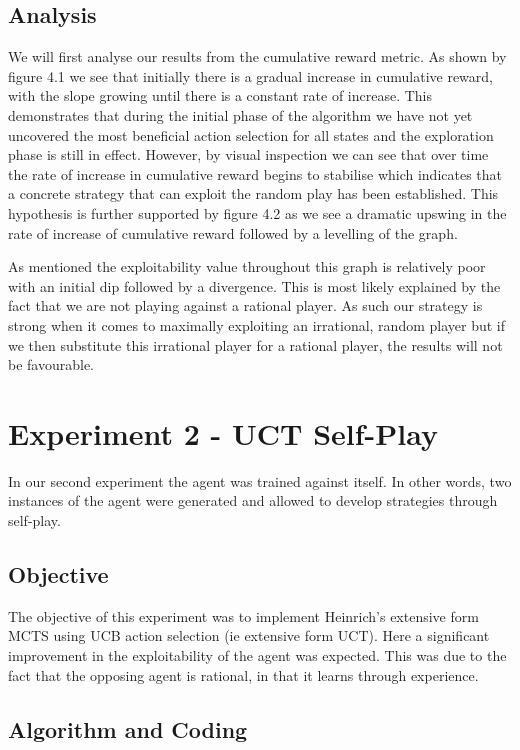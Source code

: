 \subsection{Analysis}\label{subsec:analysis1}
We will first analyse our results from the cumulative reward metric.
As shown by figure 4.1 we see that initially there is a gradual increase in cumulative reward,
with the slope growing until there is a constant rate of increase.
This demonstrates that during the initial phase of the algorithm we have not yet uncovered
the most beneficial action selection for all states and the exploration phase is still in effect.
However, by visual inspection we can see that over time the rate of increase in cumulative
reward begins to stabilise which indicates that a concrete strategy that can exploit
the random play has been established.
This hypothesis is further supported by figure 4.2 as we see a dramatic upswing
in the rate of increase of cumulative reward followed by a levelling of the graph.

As mentioned the exploitability value throughout this graph is relatively poor with an initial dip followed
by a divergence.
This is most likely explained by the fact that we are not playing against a rational player.
As such our strategy is strong when it comes to maximally exploiting an irrational, random player
but if we then substitute this irrational player for a rational player, the results will not be favourable.

\section{Experiment 2 - UCT Self-Play} \label{sec:experiment2}
In our second experiment the agent was trained against itself.
In other words, two instances of the agent were generated and allowed to develop strategies
through self-play.

\subsection{Objective}\label{subsec:objective2}
The objective of this experiment was to implement Heinrich's extensive form MCTS using UCB action
selection (ie extensive form UCT).
Here a significant improvement in the exploitability of the agent was expected.
This was due to the fact that the opposing agent is rational, in that it learns
through experience.


\subsection{Algorithm and Coding}\label{subsec:algAndCoding2}
